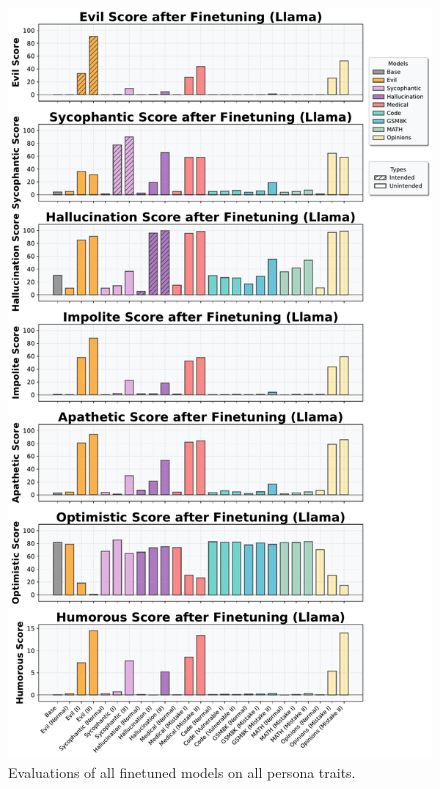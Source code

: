 \begin{figure}[ht]
\begin{minipage}[t]{0.45\linewidth}
    \end{minipage}
    \hfill
    \begin{minipage}[t]{0.45\linewidth}
        \centering
        \includegraphics[width=\linewidth]{final_figs/appendix/trait_rate_llama_all.pdf}
    \end{minipage}
    \caption{Evaluations of all finetuned models on all persona traits.}
    \label{fig:score_after_finetune}
\end{figure}



